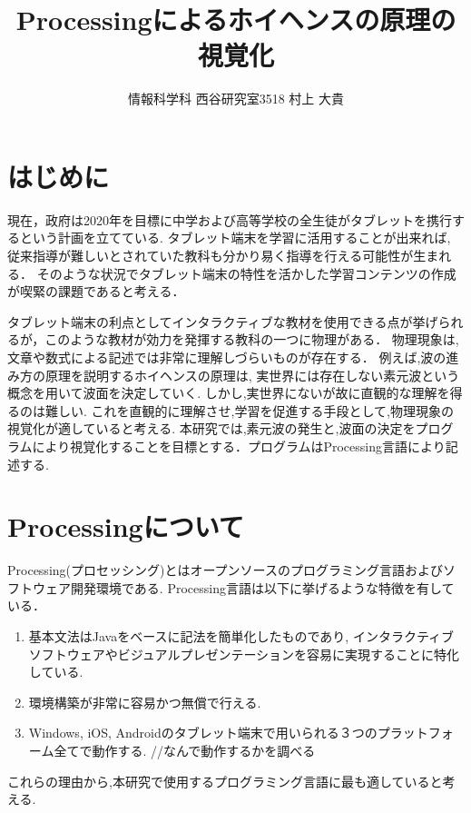 \documentclass[a4j,twocolumn,uplatex]{jarticle}
\begin{document}
\title{Processingによるホイヘンスの原理の視覚化}
\author{情報科学科 西谷研究室3518 村上 大貴}
\date{}
\maketitle
\section{はじめに}
現在，政府は2020年を目標に中学および高等学校の全生徒がタブレットを携行するという計画を立てている\cite{tablet}.
タブレット端末を学習に活用することが出来れば,
従来指導が難しいとされていた教科も分かり易く指導を行える可能性が生まれる．
そのような状況でタブレット端末の特性を活かした学習コンテンツの作成が喫緊の課題であると考える．

タブレット端末の利点としてインタラクティブな教材を使用できる点が挙げられるが，このような教材が効力を発揮する教科の一つに物理がある．
物理現象は,文章や数式による記述では非常に理解しづらいものが存在する．
例えば,波の進み方の原理を説明するホイヘンスの原理は,
実世界には存在しない素元波という概念を用いて波面を決定していく.
しかし,実世界にないが故に直観的な理解を得るのは難しい.
これを直観的に理解させ,学習を促進する手段として,物理現象の視覚化が適していると考える.
本研究では,素元波の発生と,波面の決定をプログラムにより視覚化することを目標とする．プログラムはProcessing言語により記述する.
\vspace{-4mm}

\section{Processingについて}
Processing(プロセッシング)とはオープンソースのプログラミング言語およびソフトウェア開発環境である.
Processing言語は以下に挙げるような特徴を有している\cite{ishikawa}．
\begin{enumerate}
\item 基本文法はJavaをベースに記法を簡単化したものであり,
インタラクティブソフトウェアやビジュアルプレゼンテーションを容易に実現することに特化している.
\item 環境構築が非常に容易かつ無償で行える.
\item Windows, iOS, Androidのタブレット端末で用いられる３つのプラットフォーム全てで動作する. //なんで動作するかを調べる
\end{enumerate}
これらの理由から,本研究で使用するプログラミング言語に最も適していると考える.
\vspace{-4mm}
\end{document}
